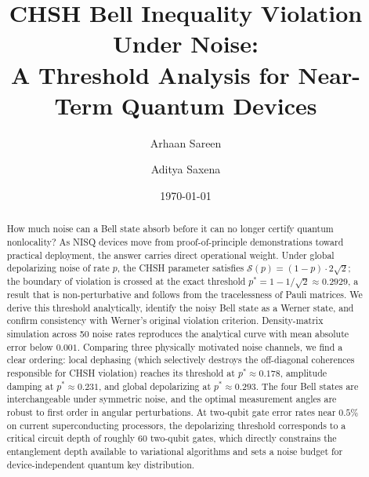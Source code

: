 \documentclass[12pt]{article}
\newcommand{\pstar}{p^*}
\newcommand{\bigS}{\mathcal{S}}
\begin{document}

\title{\textbf{CHSH Bell Inequality Violation Under Noise:\\
A Threshold Analysis for Near-Term Quantum Devices}}

\author[1]{Arhaan Sareen}
\author[2]{Aditya Saxena}

\date{\today}
\maketitle

\begin{abstract}
How much noise can a Bell state absorb before it can no longer certify quantum nonlocality?
As NISQ devices move from proof-of-principle demonstrations toward practical deployment, the
answer carries direct operational weight.
Under global depolarizing noise of rate $p$, the CHSH parameter satisfies
$\bigS(p) = (1-p)\cdot 2\sqrt{2}$; the boundary of violation is crossed at the exact threshold
$\pstar = 1 - 1/\!\sqrt{2} \approx 0.2929$, a result that is non-perturbative and follows from
the tracelessness of Pauli matrices.
We derive this threshold analytically, identify the noisy Bell state as a Werner state, and confirm
consistency with Werner's original violation criterion.
Density-matrix simulation across 50 noise rates reproduces the analytical curve with mean absolute
error below $0.001$.
Comparing three physically motivated noise channels, we find a clear ordering: local dephasing
(which selectively destroys the off-diagonal coherences responsible for CHSH violation) reaches its
threshold at $\pstar \approx 0.178$, amplitude damping at $\pstar \approx 0.231$, and global
depolarizing at $\pstar \approx 0.293$.
The four Bell states are interchangeable under symmetric noise, and the optimal measurement angles
are robust to first order in angular perturbations.
At two-qubit gate error rates near $0.5\%$ on current superconducting processors, the depolarizing
threshold corresponds to a critical circuit depth of roughly 60 two-qubit gates, which directly
constrains the entanglement depth available to variational algorithms and sets a noise budget for
device-independent quantum key distribution.
\end{abstract}
\end{document}
